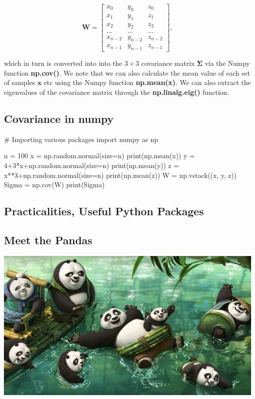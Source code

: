 \documentclass[%
oneside,                 %
final,                   %
10pt]{article}
\begin{document}
\[
\bm{W} = \begin{bmatrix} x_0 & y_0 & z_0 \\
                          x_1 & y_1 & z_1 \\
                          x_2 & y_2 & z_2 \\
                          \dots & \dots & \dots \\
                          x_{n-2} & y_{n-2} & z_{n-2} \\
                          x_{n-1} & y_{n-1} & z_{n-1}
             \end{bmatrix},
\]

which in turn is converted into into the $3\times 3$ covariance matrix
$\bm{\Sigma}$ via the Numpy function \textbf{np.cov()}. We note that we can
also calculate the mean value of each set of samples $\bm{x}$ etc
using the Numpy function \textbf{np.mean(x)}. We can also extract the
eigenvalues of the covariance matrix through the \textbf{np.linalg.eig()}
function.


\subsection{Covariance in numpy}

\bpycod
# Importing various packages
import numpy as np

n = 100
x = np.random.normal(size=n)
print(np.mean(x))
y = 4+3*x+np.random.normal(size=n)
print(np.mean(y))
z = x**3+np.random.normal(size=n)
print(np.mean(z))
W = np.vstack((x, y, z))
Sigma = np.cov(W)
print(Sigma)
\epycod

\subsection{Practicalities, Useful Python Packages}


\subsection{Meet the Pandas}




\vspace{6mm}

\centerline{\includegraphics[width=0.8\linewidth]{fig/pandas.jpg}}
\end{document}
